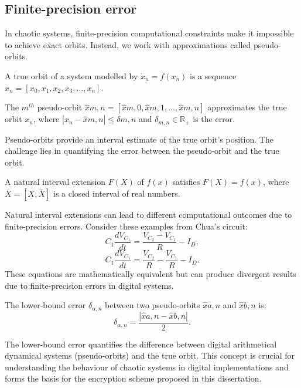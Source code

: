 \subsection{Finite-precision error}
In chaotic systems, finite-precision computational constraints make it impossible to achieve exact orbits. Instead, we work with approximations called pseudo-orbits.
\begin{definition}
A true orbit of a system modelled by $\dot{x}_n = f(x_n)$ is a sequence ${x_n} = [x_0, x_1, x_2, x_3, \ldots, x_n]$.
\end{definition}
\begin{definition}
The $m^{th}$ pseudo-orbit ${\hat{x}{m,n}} = [\hat{x}{m,0}, \hat{x}{m,1}, \ldots, \hat{x}{m,n}]$ approximates the true orbit ${x_n}$, where $|x_n-\hat{x}{m,n}| \leq \delta{m,n}$ and $\delta_{m,n} \in \mathbb{R_+}$ is the error.
\end{definition}
Pseudo-orbits provide an interval estimate of the true orbit's position. The challenge lies in quantifying the error between the pseudo-orbit and the true orbit.
\begin{definition}
A natural interval extension $F(X)$ of $f(x)$ satisfies $F(X) = f(x)$, where $X = [\underline{X},\overline{X}]$ is a closed interval of real numbers.
\end{definition}
Natural interval extensions can lead to different computational outcomes due to finite-precision errors. Consider these examples from Chua's circuit:
\begin{equation}
C_1 \dfrac{dV_{C_1}}{dt} = \dfrac{V_{C_2} - V_{C_1}}{R} - I_{D},
\label{eq:Extension1}
\end{equation}
\begin{equation}
C_1 \dfrac{dV_{C_1}}{dt} = \dfrac{V_{C_2}}{R} - \dfrac{V_{C_1}}{R} - I_{D}.
\label{eq:Extension2}
\end{equation}
These equations are mathematically equivalent but can produce divergent results due to finite-precision errors in digital systems.
\begin{definition}
The lower-bound error $\delta_{\alpha,n}$ between two pseudo-orbits ${\hat{x}{a,n}}$ and ${\hat{x}{b,n}}$ is:
\begin{equation}
\delta_{\alpha,n} = \dfrac{|\hat{x}{a,n} - \hat{x}{b,n}|}{2}.
\label{eq:LBE}
\end{equation}
\end{definition}
The lower-bound error quantifies the difference between digital arithmetical dynamical systems (pseudo-orbits) and the true orbit. This concept is crucial for understanding the behaviour of chaotic systems in digital implementations and forms the basis for the encryption scheme proposed in this dissertation.
